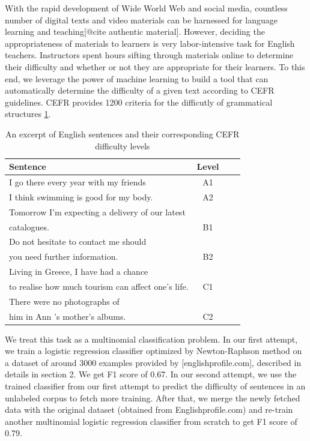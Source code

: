 With the rapid development of Wide World Web and social media, countless number of digital texts and video materials can be harnessed for language learning and teaching[@cite authentic material]. However, deciding the appropriateness of materials to learners is very labor-intensive task for English teachers. Instructors spent hours sifting through materials online to determine their difficulty and whether or not they are appropriate for their learners. To this end, we leverage the power of machine learning to build a tool that can automatically determine the difficulty of a given text according to CEFR guidelines. 
CEFR provides 1200 criteria \citep{noauthor_english_nodate} for the difficutly of grammatical structures \ref{tab:cefr}.
\begin{table}
\caption{An excerpt of English sentences and their corresponding CEFR difficulty levels}
\centering
\begin{tabular}{l|c|c|c}
Sentence   & Level \\
\hline
I go there every year with my friends & A1 & \\
I think swimming is good for my body. & A2 & \\
Tomorrow I'm expecting a delivery of our latest\\ catalogues. & B1 & \\
Do not hesitate to contact me should \\you need further information. & B2 & \\
Living in Greece, I have had a chance \\to realise how much tourism can affect one's life. & C1 & \\
There were no photographs of \\him in Ann 's mother's albums. & C2 & \\
\end{tabular}
\label{tab:cefr}
\end{table}

We treat this task as a multinomial classification problem. In our first attempt, we train a logistic regression classifier optimized by Newton-Raphson method on a dataset of around 3000 examples provided by [englishprofile.com], described in details in section 2. We get F1 score of 0.67. In our second attempt, we use the trained classifier from our first attempt to predict the difficulty of sentences in an unlabeled corpus to fetch more training. After that, we merge the newly fetched data with the original dataset (obtained from Englishprofile.com) and re-train another multinomial logistic regression classifier from scratch to get F1 score of 0.79. 

